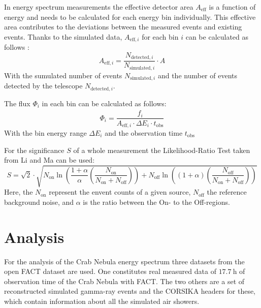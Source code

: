     In energy spectrum measurements the effective detector area $A_\text{eff}$ is a function of energy and needs to be calculated for each energy bin individually.
    This effective area contributes to the deviations between the measured events and existing events.
    Thanks to the simulated data, $A_{\text{eff},i}$ for each bin $i$ can be calculated as follows \cite{FACTManual}:
    \begin{equation}
        A_{\text{eff},i} = \frac{N_{\text{detected},i}}{N_{\text{simulated},i}} \cdot A
        \label{eq:acceptance}
    \end{equation}
    With the sumulated number of events $N_{\text{simulated},i}$ and the number of events detected by the telescope $N_{\text{detected},i}$.

    The flux $\Phi_i$ in each bin can be calculated as follows:
    \begin{equation}
        \Phi_i = \frac{\hat{f}_i}{A_{\text{eff},i} \cdot \Delta E_i \cdot t_\text{obs}}
        \label{eq:flux}
    \end{equation}
    With the bin energy range $\Delta E_i$ and the observation time $t_\text{obs}$
    
    For the significance $S$ of a whole measurement the Likelihood-Ratio Test taken from Li and Ma \cite{significance} can be used:
    \begin{equation}
        S = \sqrt{2} \cdot \sqrt{N_\text{on} \ln\left( \frac{1 + \alpha}{\alpha} \left( \frac{N_\text{on}}{N_\text{on} + N_\text{off}} \right) \right) + N_\text{off} \ln\left( (1 + \alpha) \left( \frac{N_\text{off}}{N_\text{on} + N_\text{off}} \right) \right) }
        \label{eq:significance}
    \end{equation}
    Here, the $N_\text{on}$ represent the envent counts of a given source, $N_\text{off}$ the reference background noise, and $\alpha$ is the ratio between the On- to the Off-regions.
%
%
    \section{Analysis}
        For the analysis of the Crab Nebula energy spectrum three datasets from the open FACT dataset are used.\cite{FACTData}
        \newline
        One constitutes real measured data of $\SI{17.7}{\hour}$ of observation time of the Crab Nebula with FACT.
        The two others are a set of reconstructed simulated gamma-ray events and the CORSIKA headers for these, which contain information about all the simulated air showers.


